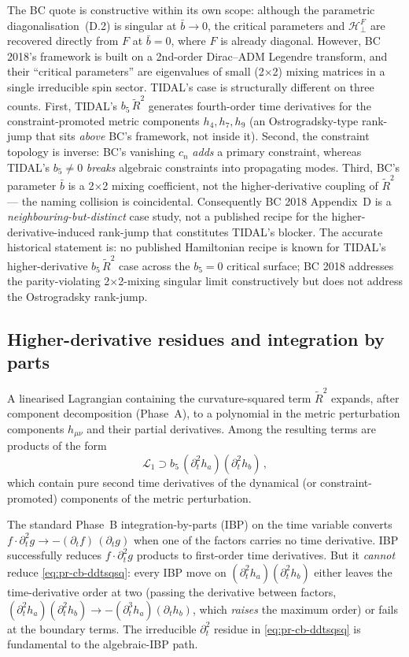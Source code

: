 The BC quote is constructive within its own scope: although the
parametric diagonalisation~(D.2) is singular at $\bar{b} \to 0$, the
critical parameters and $\mathcal{H}^F_\perp$ are recovered directly from
$F$ at $\bar{b} = 0$, where $F$ is already diagonal.  However, BC
2018's framework is built on a 2nd-order Dirac--ADM Legendre transform,
and their ``critical parameters'' are eigenvalues of small (2$\times$2)
mixing matrices in a single irreducible spin sector.  TIDAL's case is
structurally different on three counts.  First, TIDAL's $b_5\,\tilde{R}^2$
generates fourth-order time derivatives for the constraint-promoted
metric components $h_4, h_7, h_9$ (an Ostrogradsky-type rank-jump that
sits \emph{above} BC's framework, not inside it).  Second, the
constraint topology is inverse: BC's vanishing $c_n$ \emph{adds} a
primary constraint, whereas TIDAL's $b_5 \neq 0$ \emph{breaks} algebraic
constraints into propagating modes.  Third, BC's parameter $\bar{b}$ is
a 2$\times$2 mixing coefficient, not the higher-derivative coupling of
$\tilde{R}^2$ --- the naming collision is coincidental.  Consequently
BC 2018 Appendix~D is a \emph{neighbouring-but-distinct} case study,
not a published recipe for the higher-derivative-induced rank-jump that
constitutes TIDAL's blocker.  The accurate historical statement is:
no published Hamiltonian recipe is known for TIDAL's higher-derivative
$b_5\,\tilde{R}^2$ case across the $b_5 = 0$ critical surface; BC 2018
addresses the parity-violating 2$\times$2-mixing singular limit
constructively but does not address the Ostrogradsky rank-jump.

\subsection{Higher-derivative residues and integration by parts}
\label{sec:pr-cb-residue}

A linearised Lagrangian containing the curvature-squared term $\tilde{R}^2$
expands, after component decomposition (Phase~A), to a polynomial in the
metric perturbation components $h_{\mu\nu}$ and their partial derivatives.
Among the resulting terms are products of the form
\begin{equation}
  \mathcal{L}_1 \supset b_5 \, (\partial_t^2 h_a)(\partial_t^2 h_b) \,,
  \label{eq:pr-cb-ddtsqsq}
\end{equation}
which contain pure second time derivatives of the dynamical (or
constraint-promoted) components of the metric perturbation.

The standard Phase~B integration-by-parts (IBP) on the time variable
\cite{ParkerSimon1993} converts $f \cdot \partial_t^2 g \to -(\partial_t f)\,(\partial_t g)$
when one of the factors carries no time derivative.  IBP successfully
reduces $f \cdot \partial_t^2 g$ products to first-order time derivatives.
But it \emph{cannot} reduce
\eqref{eq:pr-cb-ddtsqsq}: every IBP move on $(\partial_t^2 h_a)(\partial_t^2 h_b)$
either leaves the time-derivative order at two (passing the derivative
between factors, $(\partial_t^2 h_a)(\partial_t^2 h_b) \to -(\partial_t^3 h_a)(\partial_t h_b)$,
which \emph{raises} the maximum order) or fails at the boundary terms.
The irreducible $\partial_t^2$ residue in \eqref{eq:pr-cb-ddtsqsq} is
fundamental to the algebraic-IBP path.


